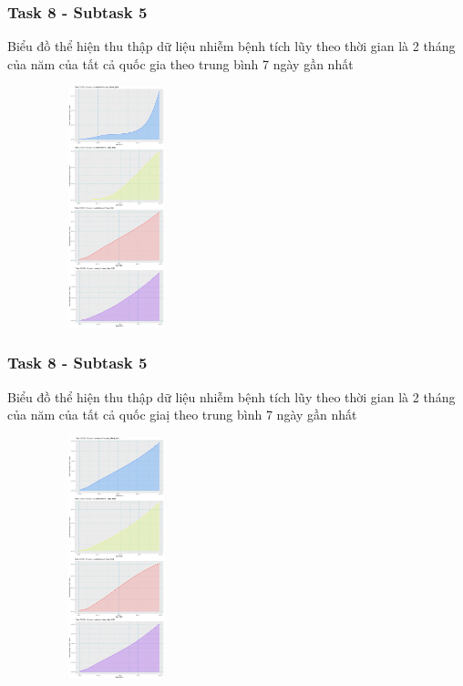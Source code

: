 \documentclass[english,10pt,table]{beamer}
\begin{document}
{
    \frametitle{Task 8 - Subtask 5}
    \begin{block}{Biểu đồ thể hiện thu thập dữ liệu nhiễm bệnh tích lũy theo thời gian là 2 tháng của năm của tất cả quốc gia theo trung bình 7 ngày gần nhất}
    \begin{figure}[H]
			\centering
			\includegraphics[height=7cm,width=4.2cm]{images/8.5.1.png}
	\end{figure}
    \end{block}
}
\frame
{
    \frametitle{Task 8 - Subtask 5}
    \begin{block}{Biểu đồ thể hiện thu thập dữ liệu nhiễm bệnh tích lũy theo thời gian là 2 tháng của năm của tất cả quốc giaị theo trung bình 7 ngày gần nhất}
    \begin{figure}[H]
			\centering
			\includegraphics[height=7cm,width=4.2cm]{images/8.5.2.png}
	\end{figure}
    \end{block}
}
\frame
\end{document}
